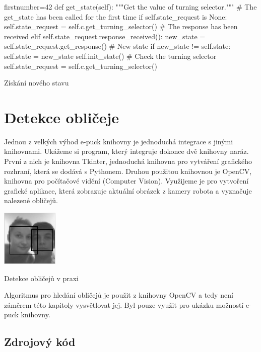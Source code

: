 \begin{listing}[H]
\begin{pyc*}{firstnumber=42}
    def get_state(self):
        """Get the value of turning selector."""
        # The get_state has been called for the first time
        if self.state_request is None:
            self.state_request = self.c.get_turning_selector()
        # The response has been received
        elif self.state_request.response_received():
            new_state = self.state_request.get_response()
            # New state
            if new_state != self.state:
                self.state = new_state
                self.init_state()
            # Check the turning selector
            self.state_request = self.c.get_turning_selector()
\end{pyc*}
\caption{Získání nového stavu}
\label{get_state}
\end{listing}

\section{Detekce obličeje}
\label{face detection}

Jednou z velkých výhod e-puck knihovny je jednoduchá integrace s jinými
knihovnami. Ukážeme si program, který integruje dokonce dvě knihovny naráz.
První z nich je knihovna Tkinter, jednoduchá knihovna pro vytváření grafického
rozhraní, která se dodává s Pythonem. Druhou použitou knihovnou je OpenCV,
knihovna pro počítačové vidění (Computer Vision). Využijeme je pro vytvoření
grafické aplikace, která zobrazuje aktuální obrázek z kamery robota a vyznačuje
nalezené obličejů.

\begin{listing}[H]
\begin{center}
    \includegraphics{opencv.png}
    \caption{Detekce obličejů v praxi}
\end{center}
\end{listing}

Algoritmus pro hledání obličejů je použit z knihovny OpenCV a tedy není záměrem
této kapitoly vysvětlovat jej. Byl pouze využit pro ukázku možností e-puck
knihovny.

\subsection{Zdrojový kód}

